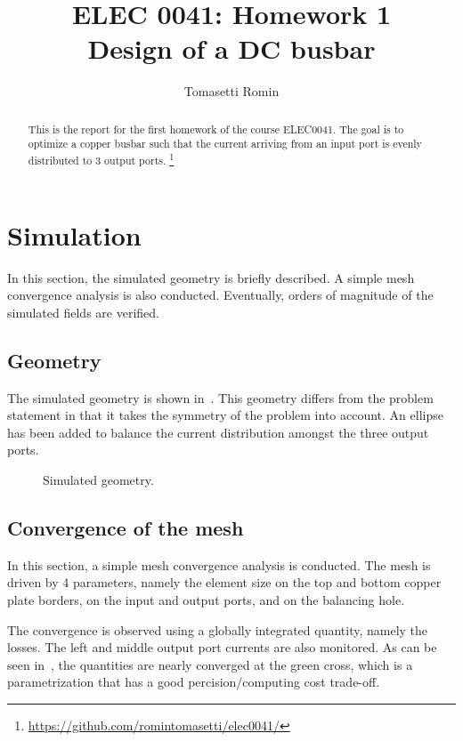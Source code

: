 \documentclass[]{article}
\title{%
    ELEC 0041: Homework 1\\
    \large Design of a DC busbar
}
\author{Tomasetti Romin}
\begin{document}
\maketitle

\begin{abstract}
    This is the report for the first homework of the course ELEC0041.
    The goal is to optimize a copper busbar such that the current arriving from an input port
    is evenly distributed to 3 output ports.
    \footnote{\url{https://github.com/romintomasetti/elec0041/}}
\end{abstract}

\section{Simulation}

In this section, the simulated geometry is briefly described.
A simple mesh convergence analysis is also conducted.
Eventually, orders of magnitude of the simulated fields are verified.

\subsection{Geometry}

The simulated geometry is shown in~.
This geometry differs from the problem statement in that it takes the symmetry of the problem into account.
An ellipse has been added to balance the current distribution amongst the three output ports.

\begin{figure}[h]
    \centering
    
    \caption{Simulated geometry.}
    \label{figure:geometry}
\end{figure}

\subsection{Convergence of the mesh}

In this section, a simple mesh convergence analysis is conducted.
The mesh is driven by 4 parameters, namely the element size on the top and bottom copper plate borders,
on the input and output ports, and on the balancing hole.

The convergence is observed using a globally integrated quantity, namely the losses.
The left and middle output port currents are also monitored.
As can be seen in~, the quantities are nearly converged at the green cross,
which is a parametrization that has a good percision/computing cost trade-off.
\end{document}
